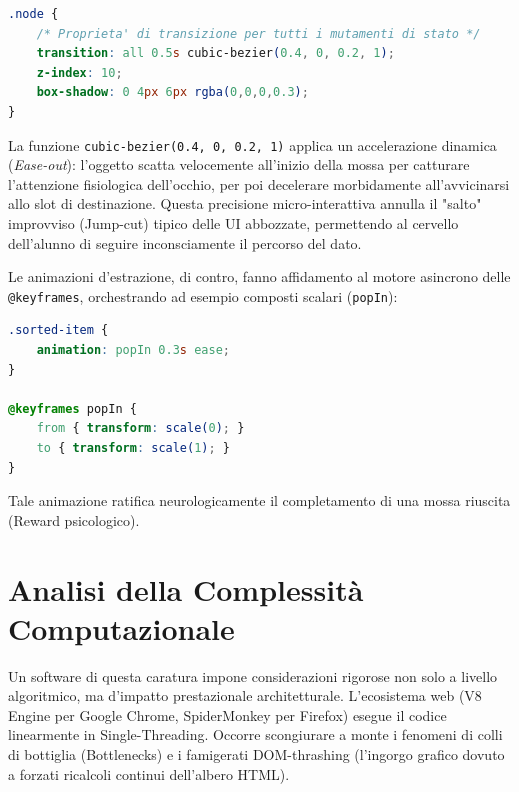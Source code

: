 \documentclass[openany]{theme/uniprthesis}
\begin{document}
\begin{lstlisting}[language=CSS, breaklines=true, basicstyle=\footnotesize\ttfamily, frame=single, caption={Transizione fluida interpolata su curva di Bézier}, keywordstyle=\color{blue}]
.node {
    /* Proprieta' di transizione per tutti i mutamenti di stato */
    transition: all 0.5s cubic-bezier(0.4, 0, 0.2, 1);
    z-index: 10;
    box-shadow: 0 4px 6px rgba(0,0,0,0.3);
}
\end{lstlisting}

La funzione \texttt{cubic-bezier(0.4, 0, 0.2, 1)} applica un accelerazione dinamica (\textit{Ease-out}): l'oggetto scatta velocemente all'inizio della mossa per catturare l'attenzione fisiologica dell'occhio, per poi decelerare morbidamente all'avvicinarsi allo slot di destinazione. Questa precisione micro-interattiva annulla il "salto" improvviso (Jump-cut) tipico delle UI abbozzate, permettendo al cervello dell'alunno di seguire inconsciamente il percorso del dato.

Le animazioni d'estrazione, di contro, fanno affidamento al motore asincrono delle \texttt{@keyframes}, orchestrando ad esempio composti scalari (\texttt{popIn}):
\begin{lstlisting}[language=CSS, breaklines=true, basicstyle=\footnotesize\ttfamily, frame=single, caption={Animazione Pop-In per i nodi ordinati}, keywordstyle=\color{blue}]
.sorted-item {
    animation: popIn 0.3s ease;
}

@keyframes popIn {
    from { transform: scale(0); }
    to { transform: scale(1); }
}
\end{lstlisting}
Tale animazione ratifica neurologicamente il completamento di una mossa riuscita (Reward psicologico).

\section{Analisi della Complessità Computazionale}
Un software di questa caratura impone considerazioni rigorose non solo a livello algoritmico, ma d'impatto prestazionale architetturale. L'ecosistema web (V8 Engine per Google Chrome, SpiderMonkey per Firefox) esegue il codice linearmente in Single-Threading. Occorre scongiurare a monte i fenomeni di colli di bottiglia (Bottlenecks) e i famigerati DOM-thrashing (l'ingorgo grafico dovuto a forzati ricalcoli continui dell'albero HTML).
\end{document}
